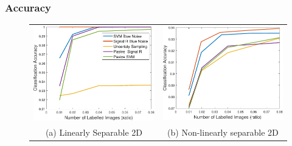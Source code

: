 \documentclass[11pts]{beamer}
\begin{document}

\begin{frame}%
\frametitle{Accuracy}

\begin{figure}[ht]
 \begin{tabular}{cc}
   \includegraphics[scale=0.4]{ACC/ERROR_INA.pdf} &
    \includegraphics[scale=0.4]{ACC/ACUR_NS2.pdf}
   \\
    (a) Linearly Separable 2D & (b) Non-linearly separable 2D\\
 \end{tabular}
 \bigskip
 
\end{figure}
\end{frame}
\end{document}

